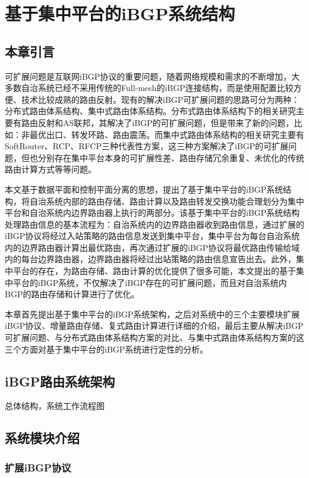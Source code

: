 \chapter{基于集中平台的iBGP系统结构}
\label{cha:china}


\section{本章引言}
可扩展问题是互联网iBGP协议的重要问题，随着网络规模和需求的不断增加，大多数自治系统已经不采用传统的Full-mesh的iBGP连接结构，而是使用配置比较方便、技术比较成熟的路由反射。现有的解决iBGP可扩展问题的思路可分为两种：分布式路由体系结构、集中式路由体系结构。分布式路由体系结构下的相关研究主要有路由反射和AS联邦，其解决了iBGP的可扩展问题，但是带来了新的问题，比如：非最优出口、转发环路、路由震荡。而集中式路由体系结构的相关研究主要有SoftRouter、RCP、RFCP三种代表性方案，这三种方案解决了iBGP的可扩展问题，但也分别存在集中平台本身的可扩展性差、路由存储冗余重复、未优化的传统路由计算方式等等问题。

本文基于数据平面和控制平面分离的思想，提出了基于集中平台的iBGP系统结构，将自治系统内部的路由存储、路由计算以及路由转发交换功能合理划分为集中平台和自治系统内边界路由器上执行的两部分。该基于集中平台的iBGP系统结构处理路由信息的基本流程为：自治系统内的边界路由器收到路由信息，通过扩展的iBGP协议将经过入站策略的路由信息发送到集中平台，集中平台为每台自治系统内的边界路由器计算出最优路由，再次通过扩展的iBGP协议将最优路由传输给域内的每台边界路由器，边界路由器将经过出站策略的路由信息宣告出去。此外，集中平台的存在，为路由存储、路由计算的优化提供了很多可能，本文提出的基于集中平台的iBGP系统，不仅解决了iBGP存在的可扩展问题，而且对自治系统内BGP的路由存储和计算进行了优化。

本章首先提出基于集中平台的iBGP系统架构，之后对系统中的三个主要模块扩展iBGP协议、增量路由存储、复式路由计算进行详细的介绍，最后主要从解决iBGP可扩展问题、与分布式路由体系结构方案的对比、与集中式路由体系结构方案的这三个方面对基于集中平台的iBGP系统进行定性的分析。
\section{iBGP路由系统架构}
总体结构，系统工作流程图


\section{系统模块介绍}
\subsection{扩展iBGP协议}
